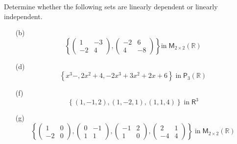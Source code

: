 Determine whether the following sets are linearly dependent or
linearly independent.
\begin{enumerate}
\item[(b)] 
\[
\left\{\begin{pmatrix}
1 & -3\\
-2 & 4
\end{pmatrix}
,
\begin{pmatrix}
-2 & 6\\
4 & -8
\end{pmatrix}\right\} 
\text{in}\;\mathsf{M}_{2\times2}(\mathbb{R})\]

\item[(d)]
\[
\left\{x^3 - , 2x^2 + 4, -2x^3 + 3x^2 + 2x +6\right\} \;\text{in}\;  \mathsf{P}_3\left(\mathbb{R}\right)
\]
\item[(f)]
\[
\left\{\left(1,-1,2\right),\left(1,-2,1\right),\left(1,1,4\right)\right\}
\;\text{in}\; \mathsf{R}^3
\]
\item[(g)]
\[
\left\{
\begin{pmatrix}
1 & 0\\
-2 & 0
\end{pmatrix},
\begin{pmatrix}
0 & -1\\
1 & 1
\end{pmatrix},
\begin{pmatrix}
-1 & 2\\
1 & 0
\end{pmatrix},
\begin{pmatrix}
2 & 1\\
-4 & 4
\end{pmatrix}
\right\}
\;\text{in}\; \mathsf{M}_{2\times2}(\mathbb{R})
\]
\end{enumerate}

